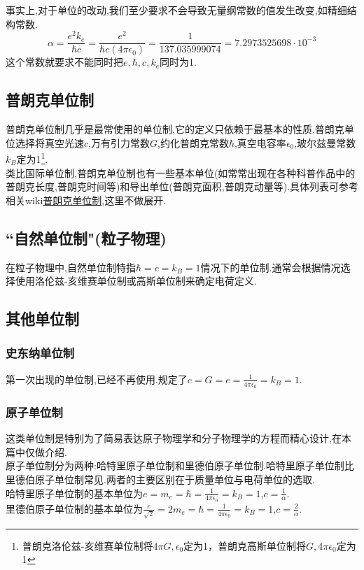 \documentclass[lang=cn,newtx,10pt,scheme=chinese,thmcnt=section]{elegantbook}
\begin{document}
事实上,对于单位的改动,我们至少要求不会导致无量纲常数的值发生改变,如精细结构常数.
$${\displaystyle \alpha ={\frac {e^{2}k_{e}}{\hbar c}}={\frac {e^{2}}{\hbar c(4\pi \epsilon _{0})}}={\frac {1}{137.035999074}}=7.2973525698\cdot 10^{-3}}$$
这个常数就要求不能同时把${\displaystyle e},{\displaystyle \hbar },{\displaystyle c},{\displaystyle k_{e}}$同时为1.
\subsection{普朗克单位制}
普朗克单位制几乎是最常使用的单位制,它的定义只依赖于最基本的性质.普朗克单位选择将真空光速${\displaystyle c}$,万有引力常数${\displaystyle G}$,约化普朗克常数${\displaystyle \hbar }$,真空电容率${\displaystyle \epsilon _{0}}$,玻尔兹曼常数${\displaystyle k_{B}}$定为1\footnote{普朗克洛伦兹-亥维赛单位制将${\displaystyle 4\pi G},{\displaystyle \epsilon _{0}}$定为1，普朗克高斯单位制将${\displaystyle G},{\displaystyle 4\pi \epsilon _{0}}$定为1}.\\
类比国际单位制,普朗克单位制也有一些基本单位(如常常出现在各种科普作品中的普朗克长度,普朗克时间等)和导出单位(普朗克面积,普朗克动量等).具体列表可参考相关wiki\href{https://zh.wikipedia.org/wiki/%E6%99%AE%E6%9C%97%E5%85%8B%E5%96%AE%E4%BD%8D%E5%88%B6}{普朗克单位制},这里不做展开.
\subsection{``自然单位制"(粒子物理)}
在粒子物理中,自然单位制特指${\displaystyle \hbar =c=k_{B}=1}$情况下的单位制.通常会根据情况选择使用洛伦兹-亥维赛单位制或高斯单位制来确定电荷定义.
\subsection{其他单位制}
\subsubsection*{史东纳单位制}
第一次出现的单位制,已经不再使用.规定了${\displaystyle c=G=e={\frac {1}{4\pi \epsilon _{0}}}=k_{B}=1}$.
\subsubsection*{原子单位制}
这类单位制是特别为了简易表达原子物理学和分子物理学的方程而精心设计,在本篇中仅做介绍.\\
原子单位制分为两种:哈特里原子单位制和里德伯原子单位制.哈特里原子单位制比里德伯原子单位制常见.两者的主要区别在于质量单位与电荷单位的选取.\\
哈特里原子单位制的基本单位为${\displaystyle e=m_{e}=\hbar ={\frac {1}{4\pi \epsilon _{0}}}=k_{B}=1}$,${\displaystyle c={\frac {1}{\alpha }}}$.\\
里德伯原子单位制的基本单位为${\displaystyle {\frac {e}{\sqrt {2}}}=2m_{e}=\hbar ={\frac {1}{4\pi \epsilon _{0}}}=k_{B}=1}$,${\displaystyle c={\frac {2}{\alpha }}}$.
\end{document}
